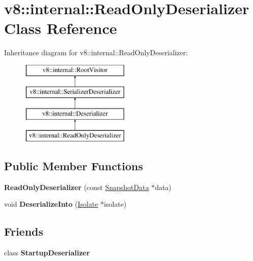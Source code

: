 \hypertarget{classv8_1_1internal_1_1ReadOnlyDeserializer}{}\section{v8\+:\+:internal\+:\+:Read\+Only\+Deserializer Class Reference}
\label{classv8_1_1internal_1_1ReadOnlyDeserializer}
Inheritance diagram for v8\+:\+:internal\+:\+:Read\+Only\+Deserializer\+:\begin{figure}[H]
\begin{center}
\leavevmode
\includegraphics[height=4.000000cm]{classv8_1_1internal_1_1ReadOnlyDeserializer}
\end{center}
\end{figure}
\subsection*{Public Member Functions}
\begin{DoxyCompactItemize}
\item 
\mbox{\label{classv8_1_1internal_1_1ReadOnlyDeserializer_ae4f6ff08e7c2f8eb94b4c75263ce42fd}} 
{\bfseries Read\+Only\+Deserializer} (const \mbox{\hyperlink{classv8_1_1internal_1_1SnapshotData}{Snapshot\+Data}} $\ast$data)
\item 
\mbox{\label{classv8_1_1internal_1_1ReadOnlyDeserializer_ad5eff4780feee9206c280be9f54a42f6}} 
void {\bfseries Deserialize\+Into} (\mbox{\hyperlink{classv8_1_1internal_1_1Isolate}{Isolate}} $\ast$isolate)
\end{DoxyCompactItemize}
\subsection*{Friends}
\begin{DoxyCompactItemize}
\item 
\mbox{\label{classv8_1_1internal_1_1ReadOnlyDeserializer_aa456f7080463117bffb6da358f86a612}} 
class {\bfseries Startup\+Deserializer}
\end{DoxyCompactItemize}
